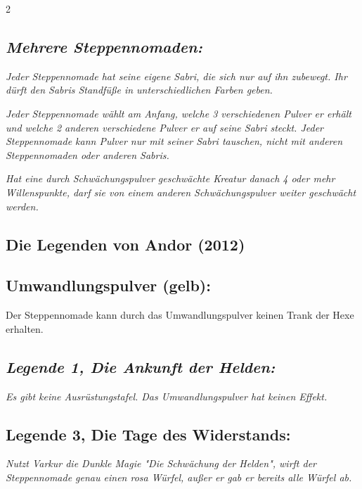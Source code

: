 \documentclass[10pt, a4paper, oneside]{book}
\newcommand{\fan}[1]{\textit{#1}}
\begin{document}
\begin{multicols*}{2}
\begin{nobgcolor}
\subsection{\fan{Mehrere Steppennomaden:}}

\fan{Jeder Steppennomade hat seine eigene Sabri, die sich nur auf ihn zubewegt. Ihr dürft den Sabris Standfüße in unterschiedlichen Farben geben.}

\fan{Jeder Steppennomade wählt am Anfang, welche 3 verschiedenen Pulver er erhält und welche 2 anderen verschiedene Pulver er auf seine Sabri steckt. Jeder Steppennomade kann Pulver nur mit seiner Sabri tauschen, nicht mit anderen Steppennomaden oder anderen Sabris.}

\fan{Hat eine durch Schwächungspulver geschwächte Kreatur danach 4 oder mehr Willenspunkte, darf sie von einem anderen Schwächungspulver weiter geschwächt werden.}


\end{nobgcolor}



\begin{bgcolor}
\section{Die Legenden von Andor (2012)}

\subsection{Umwandlungspulver (gelb):}

Der Steppennomade kann durch das Umwandlungspulver keinen Trank der Hexe erhalten.
\supercite{mh-pulver}




\subsection{\fan{Legende 1, Die Ankunft der Helden:}}

\fan{Es gibt keine Ausrüstungstafel. Das Umwandlungspulver hat keinen Effekt.}




\subsection{Legende 3, Die Tage des Widerstands:}

\fan{Nutzt Varkur die Dunkle Magie "Die Schwächung der Helden", wirft der Steppennomade genau einen rosa Würfel, außer er gab er bereits alle Würfel ab.}


\end{bgcolor}
\end{multicols*}
\end{document}
